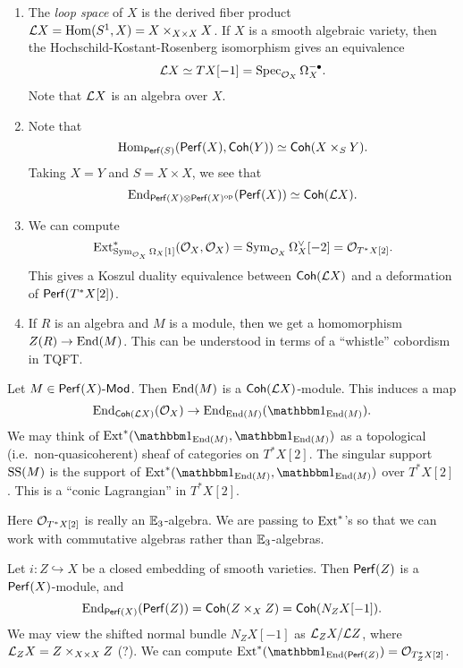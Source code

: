 \documentclass{article}
\begin{document}
\begin{enumerate}
	\item The \emph{loop space} of $X$ is the derived fiber product $\mathcal{L} X = \operatorname{Hom}(S^1, X) = X \times_{X \times X} X$.
		If $X$ is a smooth algebraic variety, then the Hochschild-Kostant-Rosenberg isomorphism gives an equivalence
		\[
			\mathcal{L} X \simeq TX[-1] = \operatorname{Spec}_{\mathcal{O}_X} \Omega_X^{-\bullet}.
		\]
		Note that $\mathcal{L} X$ is an algebra over $X$.
	\item Note that
		\[
			\operatorname{Hom}_{\mathsf{Perf}(S)}(\mathsf{Perf}(X), \mathsf{Coh}(Y)) \simeq \mathsf{Coh}(X \times_S Y).
		\]
		Taking $X = Y$ and $S = X \times X$, we see that 
		\[
			\operatorname{End}_{\mathsf{Perf}(X) \otimes \mathsf{Perf}(X)^{\mathrm{op}}}(\mathsf{Perf}(X)) \simeq \mathsf{Coh}(\mathcal{L} X).
		\]
	\item We can compute
		\[
			\operatorname{Ext}_{\operatorname{Sym}_{\mathcal{O}_X} \Omega_X[1]}^*(\mathcal{O}_X, \mathcal{O}_X) = \operatorname{Sym}_{\mathcal{O}_X} \Omega_X^\vee[-2] = \mathcal{O}_{T^* X[2]}.
		\]
		This gives a Koszul duality equivalence between $\mathsf{Coh}(\mathcal{L} X)$ and a deformation of $\mathsf{Perf}(T^* X[2])$.
	\item If $R$ is an algebra and $M$ is a module, then we get a homomorphism $Z(R) \to \operatorname{End}(M)$.
		This can be understood in terms of a ``whistle'' cobordism in TQFT.
\end{enumerate}

\begin{dfn}
	Let $M \in \mathsf{Perf}(X)\text{-}\mathsf{Mod}$.
	Then $\operatorname{End}(M)$ is a $\mathsf{Coh}(\mathcal{L} X)$-module.
	This induces a map 
	\[
		\End_{\Coh(\Lc X)}(\Oc_X) \to \End_{\End(M)}(\onebb_{\End(M)}).
	\]
	We may think of $\Ext^*(\onebb_{\End(M)}, \onebb_{\End(M)})$ as a topological (i.e.\ non-quasicoherent) sheaf of categories on $T^* X[2]$.
	The singular support $\operatorname{SS}(M)$ is the support of $\Ext^*(\onebb_{\End(M)}, \onebb_{\End(M)})$ over $T^* X[2]$.
	This is a ``conic Lagrangian'' in $T^* X[2]$.
\end{dfn}

Here $\mathcal{O}_{T^* X[2]}$ is really an $\mathbb{E}_3$-algebra.
We are passing to $\operatorname{Ext}^*$'s so that we can work with commutative algebras rather than $\mathbb{E}_3$-algebras.

\begin{ex}
	Let $i: Z \hookrightarrow X$ be a closed embedding of smooth varieties.
	Then $\mathsf{Perf}(Z)$ is a $\mathsf{Perf}(X)$-module, and
	\[
		\operatorname{End}_{\mathsf{Perf}(X)}(\mathsf{Perf}(Z)) = \mathsf{Coh}(Z \times_X Z) = \mathsf{Coh}(N_Z X[-1]).
	\]
	We may view the shifted normal bundle $N_Z X[-1]$ as $\mathcal{L}_Z X / \mathcal{L} Z$, where $\mathcal{L}_Z X = Z \times_{X \times X} Z$ (?).
	We can compute $\Ext^*(\onebb_{\End(\Perf(Z)}) = \Oc_{T_Z^* X[2]}$.
\end{ex}
\end{document}

